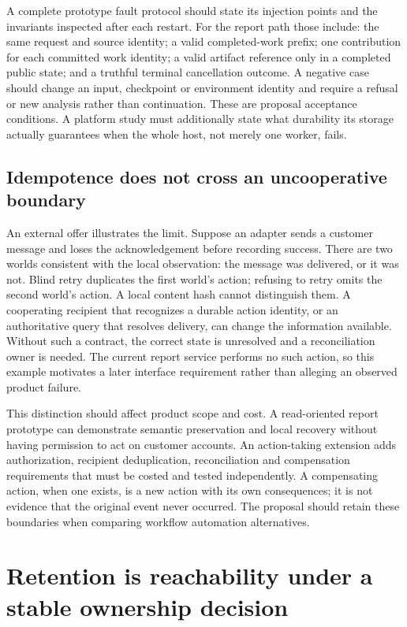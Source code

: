 A complete prototype fault protocol should state its injection points and
the invariants inspected after each restart. For the report path those
include: the same request and source identity; a valid completed-work prefix;
one contribution for each committed work identity; a valid artifact reference
only in a completed public state; and a truthful terminal cancellation
outcome. A negative case should change an input, checkpoint or environment
identity and require a refusal or new analysis rather than continuation.
These are proposal acceptance conditions. A platform study must additionally
state what durability its storage actually guarantees when the whole host,
not merely one worker, fails.

\subsection{Idempotence does not cross an uncooperative boundary}

An external offer illustrates the limit. Suppose an adapter sends a customer
message and loses the acknowledgement before recording success. There are
two worlds consistent with the local observation: the message was delivered,
or it was not. Blind retry duplicates the first world's action; refusing to
retry omits the second world's action. A local content hash cannot distinguish
them. A cooperating recipient that recognizes a durable action identity,
or an authoritative query that resolves delivery, can change the information
available. Without such a contract, the correct state is unresolved and a
reconciliation owner is needed. The current report service performs no such
action, so this example motivates a later interface requirement rather than
alleging an observed product failure.

This distinction should affect product scope and cost. A read-oriented report
prototype can demonstrate semantic preservation and local recovery without
having permission to act on customer accounts. An action-taking extension
adds authorization, recipient deduplication, reconciliation and compensation
requirements that must be costed and tested independently. A compensating
action, when one exists, is a new action with its own consequences; it is
not evidence that the original event never occurred. The proposal should
retain these boundaries when comparing workflow automation alternatives.

\section{Retention is reachability under a stable ownership decision}
\label{exec17:i4-retention}

